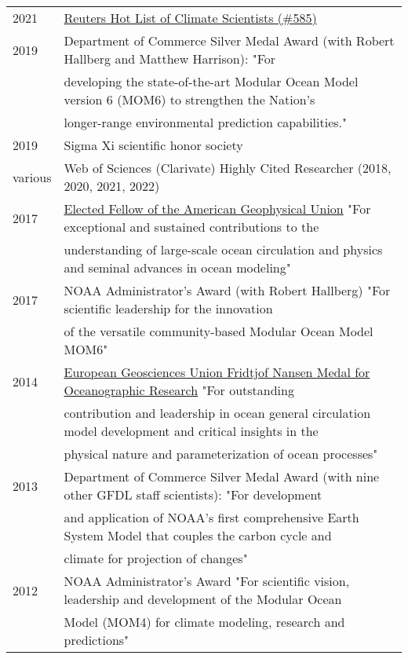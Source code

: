 \documentclass{article}
\begin{document}
\begin{tabular}{ll}
  2021 & \href{https://app.dimensions.ai/details/entities/publication/author/ur.010052126545.52}{Reuters Hot List of Climate Scientists (\#585)} 
  \\
  2019 & Department of Commerce Silver Medal Award (with Robert Hallberg and Matthew Harrison): "For \\ &  developing the state-of-the-art Modular Ocean Model version 6 (MOM6) to strengthen the Nation's \\& longer-range environmental prediction capabilities."
  \\
  2019 & Sigma Xi scientific honor society 
  \\
  various  & Web of Sciences (Clarivate) Highly Cited Researcher (2018, 2020, 2021, 2022)
  \\
  2017 & \href{https://eos.org/agu-news/celebrating-the-2017-class-of-fellows}{Elected Fellow of the American Geophysical Union} "For exceptional and sustained contributions to the \\ &  understanding of large-scale ocean circulation and physics and seminal advances in ocean modeling"
\\
  2017 & NOAA Administrator's Award (with Robert Hallberg) "For scientific leadership for the innovation \\ & of the versatile  community-based Modular Ocean Model MOM6" 
  \\
  2014 & \href{http://www.egu.eu/awards-medals/fridtjof-nansen/2014/stephen-m-griffies/}{European Geosciences Union Fridtjof Nansen Medal for
         Oceanographic Research}  "For 
outstanding \\ & contribution and leadership in 
ocean general circulation model development 
and critical insights in the \\ & physical 
nature and parameterization of ocean processes"
\\
  2013 & Department of Commerce Silver Medal Award (with nine other
  GFDL staff scientists): 
  "For development \\ & and application of NOAA's first comprehensive  
  Earth System Model  
  that couples the carbon cycle and \\ & climate for projection of changes" \\
  2012 & NOAA Administrator's Award "For scientific vision, leadership
  and development of 
  the Modular Ocean \\ & Model (MOM4) for climate modeling, research and
  predictions" \\

\end{tabular}
\end{document}
